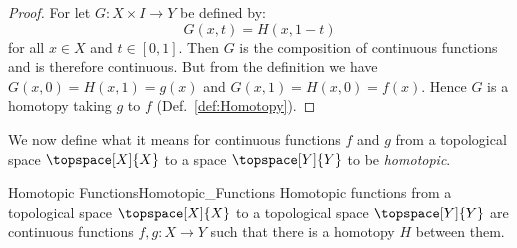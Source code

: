 \documentclass{article}                                                        %
\begin{document}
        \begin{proof}
            For let $G:X\times{I}\rightarrow{Y}$ be defined by:
            \begin{equation}
                G(x,t)=H(x,1-t)
            \end{equation}
            for all $x\in{X}$ and $t\in[0,1]$. Then $G$ is the composition of
            continuous functions and is therefore continuous. But from the
            definition we have $G(x,0)=H(x,1)=g(x)$ and $G(x,1)=H(x,0)=f(x)$.
            Hence $G$ is a homotopy taking $g$ to $f$ (Def.~\ref{def:Homotopy}).
        \end{proof}
        We now define what it means for continuous functions $f$ and $g$ from a
        topological space $\topspace[X]{X}$ to a space $\topspace[Y]{Y}$ to be
        \textit{homotopic}.
        \begin{fdefinition}{Homotopic Functions}{Homotopic_Functions}
            Homotopic functions from a topological space $\topspace[X]{X}$ to a
            topological space $\topspace[Y]{Y}$ are continuous functions
            $f,g:{X}\rightarrow{Y}$ such that there is a homotopy $H$ between
            them.
        \end{fdefinition}
\end{document}
